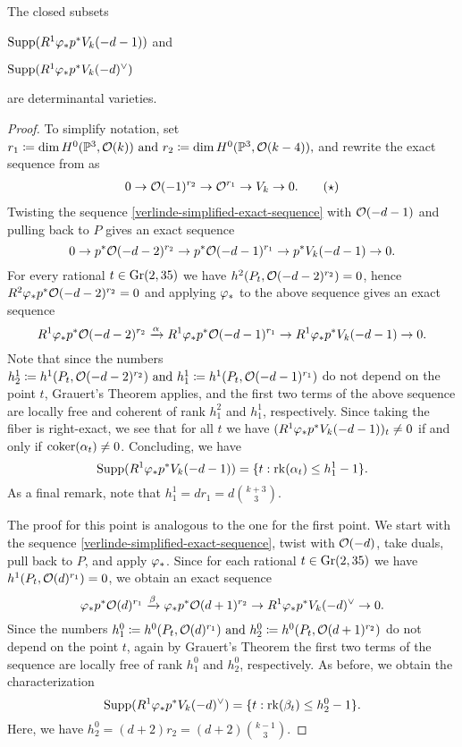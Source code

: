 \begin{proposition}
The closed subsets

$\operatorname{Supp}(R^1 \varphi_{*}p^{*} V_{k}(-d-1))$ and

$\operatorname{Supp}(R^1 \varphi_{*}p^{*} V_{k}(-d)^\vee)$ 

are determinantal varieties.
\end{proposition}
\begin{proof}
To simplify notation, set
$r_1 \coloneqq \dim H^0(\mathbb{P}^3, \mathcal{O}(k))
\text{ and }
r_2 \coloneqq \dim H^0(\mathbb{P}^3, \mathcal{O}(k-4)),$
and rewrite the exact sequence from  as
\begin{align} \label{verlinde-simplified-exact-sequence}
0 \to \mathcal{O}(-1)^{r_2} \to \mathcal{O}^{r_1} \to V_k \to 0. \tag{$\star$}
\end{align}
 Twisting the sequence \ref{verlinde-simplified-exact-sequence} with $\mathcal{O}(-d-1)$ and pulling back to $P$ gives an exact sequence
\[
0
\to  {p^{*}\mathcal{O}(-d-2)^{r_2}}
\to  {p^{*}\mathcal{O}(-d-1)^{r_1}}
\to  {p^{*}V_k(-d-1)}
\to  0.
\]
For every rational $t\in \operatorname{Gr}(2,35)$ we have
$h^2(P_t, \mathcal{O}(-d-2)^{r_2}) = 0$,
hence
$R^2\varphi_{*}p^{*}\mathcal{O}(-d-2)^{r_2} = 0$
and applying $\varphi_{*}$ to the above sequence gives an exact sequence
\[
R^1\varphi_{*}p^{*}\mathcal{O}(-d-2)^{r_2}
\xrightarrow{\alpha}
R^1\varphi_{*}p^{*}\mathcal{O}(-d-1)^{r_1} 
\to
R^1\varphi_{*}p^{*} V_k(-d-1)
\to 0.
\]
Note that since the numbers
$
h^{1}_{2}\coloneqq h^1(P_t, \mathcal{O}(-d-2)^{r_2})
\text{ and }
h_{1}^{1}\coloneqq h^1(P_t, \mathcal{O}(-d-1)^{r_1})
$
do not depend on the point $t$, Grauert's Theorem applies, and the first two terms of the above sequence are locally free and coherent of rank $h_1^2$ and $h_1^1$, respectively. Since taking the fiber is right-exact, we see that for all $t$ we have
$(R^1\varphi_{*}p^{*} V_k(-d-1))_t \neq 0$ if and only if $\operatorname{coker}(\alpha_t) \neq 0$. Concluding, we have
\[
\operatorname{Supp}(R^1\varphi_{*}p^{*} V_k(-d-1))
= \{t : \operatorname{rk} (\alpha_t)\leq h^{1}_1 - 1\}.
\]
As a final remark, note that $h^1_1 = d r_1 = d \binom{k+3}{3}.$

 The proof for this point is analogous to the one for the first point. We start with the sequence \ref{verlinde-simplified-exact-sequence}, twist with $\mathcal{O}(-d)$, take duals, pull back to $P$, and apply $\varphi_{*}$. Since for each rational $t\in \operatorname{Gr}(2,35)$ we have $h^1(P_t, \mathcal{O}(d)^{r_1})=0$, we obtain an exact sequence
\[
	{\varphi_{*}p^{*}\mathcal{O}(d)^{r_1} }
\xrightarrow{\beta}	{\varphi_{*}p^{*}\mathcal{O}(d+1)^{r_2}}
\to	{R^1 \varphi_{*}p^{*} V_{k}(-d)^\vee}
\to 0.
\]
Since the numbers
$
h^0_1 \coloneqq h^0(P_t,\mathcal{O}(d)^{r_1}) \text{ and }
h^0_2 \coloneqq h^0(P_t, \mathcal{O}(d+1)^{r_2})
$
do not depend on the point $t$, again by Grauert's Theorem the first two terms of the sequence are locally free of rank $h^0_1$ and $h^0_2$, respectively. As before, we obtain the characterization
\[
	\operatorname{Supp}(R^1 \varphi_{*}p^{*} V_{k}(-d)^\vee)
	= \{t : \operatorname{rk} (\beta_t)\leq h^{0}_2 - 1\}.
\]
Here, we have $h_2^0 = (d+2)r_2 = (d+2)\binom{k-1}{3}.$
\end{proof}

